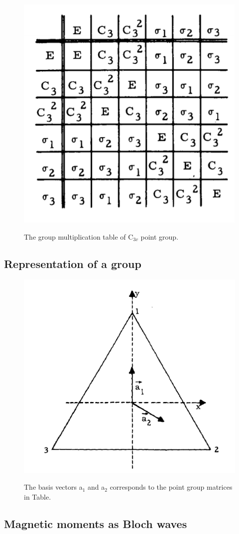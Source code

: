 \documentclass[10pt,doublespacing,edeposit]{uiucthesis2020}
\begin{document}
\begin{mainmatter}
\begin{figure}
\centering\includegraphics[width=0.5\columnwidth]{figures/ch4/group_multiplication_table_C3v.png} \\
\caption{\label{fig:gmt_C3v}
The group multiplication table of C$_{3v}$ point group.
}
\end{figure}

\subsection{Representation of a group}


\begin{figure}
\centering\includegraphics[width=0.5\columnwidth]{figures/ch4/C3v_a1_a2.png} \\
\caption{\label{fig:C3v_a1_a2}
The basis vectors a$_1$ and a$_2$ corresponds to the point group matrices in Table.
}
\end{figure}

\subsection{Magnetic moments as Bloch waves}



\end{mainmatter}
\end{document}
